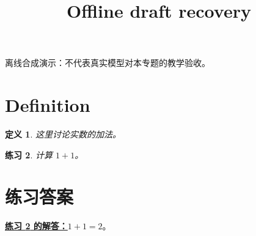 \documentclass[UTF8,fontset=fandol,11pt]{ctexart}
\title{Offline draft recovery}
\date{}
\newtheorem{definition}{定义}[section]
\newtheorem{exercise}[definition]{练习}
\begin{document}
\maketitle
\par\noindent 离线合成演示：不代表真实模型对本专题的教学验收。\par
\section{Definition}\label{sec:S01}
\begin{definition}
这里讨论实数的加法。
\end{definition}
\begin{exercise}
\label{mathagent:exercise:9d1ffdd854167f1cbed066b927248fdfb8c3275b005db30f4a8cf5f1f6900586}
计算 $1+1$。
\end{exercise}
\section*{练习答案}
\par\noindent\textbf{\hyperref[mathagent:exercise:9d1ffdd854167f1cbed066b927248fdfb8c3275b005db30f4a8cf5f1f6900586]{练习 \ref*{mathagent:exercise:9d1ffdd854167f1cbed066b927248fdfb8c3275b005db30f4a8cf5f1f6900586} 的解答：}}$1+1=2$。\par
\end{document}
